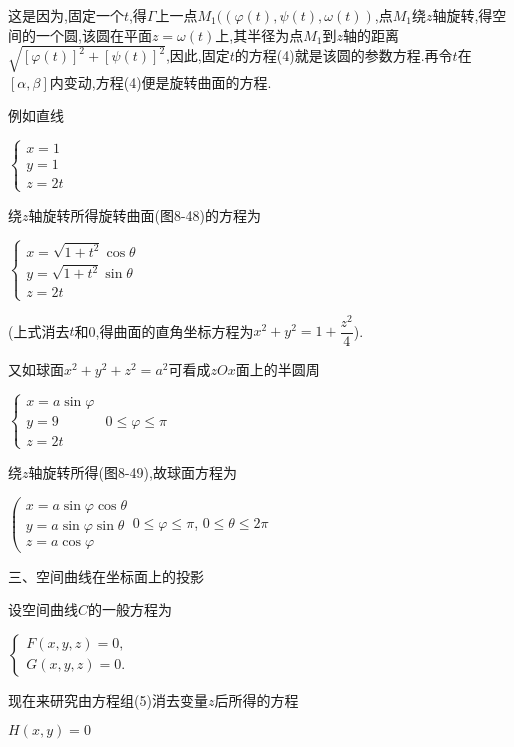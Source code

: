 \documentclass[oneside]{book}
\begin{document}
这是因为,固定一个$t$,得$\Gamma $上一点${M_1}((\varphi (t),\psi (t),\omega (t))$,点${M_1}$绕$z$轴旋转,得空间的一个圆,该圆在平面$z = \omega (t)$上,其半径为点${M_1}$到$z$轴的距离$\sqrt {{{[\varphi (t)]}^2} + {{[\psi (t)]}^2}} $,因此,固定$t$的方程(4)就是该圆的参数方程.再令$t$在$[\alpha ,\beta ]$内变动,方程(4)便是旋转曲面的方程.

例如直线

$\left\{\begin{array}{l}{x=1} \\ {y=1} \\ {z=2 t}\end{array}\right.$

绕$z$轴旋转所得旋转曲面(图8-48)的方程为

$\left\{\begin{array}{l}{x=\sqrt{1+t^{2}} \cos \theta} \\ {y=\sqrt{1+t^{2}} \sin \theta} \\ {z=2 t}\end{array}\right.$

(上式消去$t$和0,得曲面的直角坐标方程为${x^2} + {y^2} = 1 + \dfrac{{{z^2}}}{4}$).

又如球面${x^2} + {y^2} + {z^2} = {a^2}$可看成$zOx$面上的半圆周

$\left\{\begin{array}{ll}{x=a \sin \varphi} & {} \\ {y=9} & {0 \leq \varphi \leq \pi} \\ {z=2 t}\end{array}\right.$

绕$z$轴旋转所得(图8-49),故球面方程为

$\left(\begin{array}{l}{x=a \sin \varphi \cos \theta} \\ {y=a \sin \varphi \sin \theta} \\ {z=a \cos \varphi}\end{array}\right.$\quad $0 \leq \varphi \leq \pi$,
$0 \leq \theta \leq 2 \pi$

三、空间曲线在坐标面上的投影

设空间曲线$C$的一般方程为

$\left\{\begin{array}{l}{F(x, y, z)=0}, \\ {G(x, y, z)=0}.\end{array}\right.$

现在来研究由方程组(5)消去变量$z$后所得的方程

$H\left( {x,y} \right) = 0$
\end{document}
